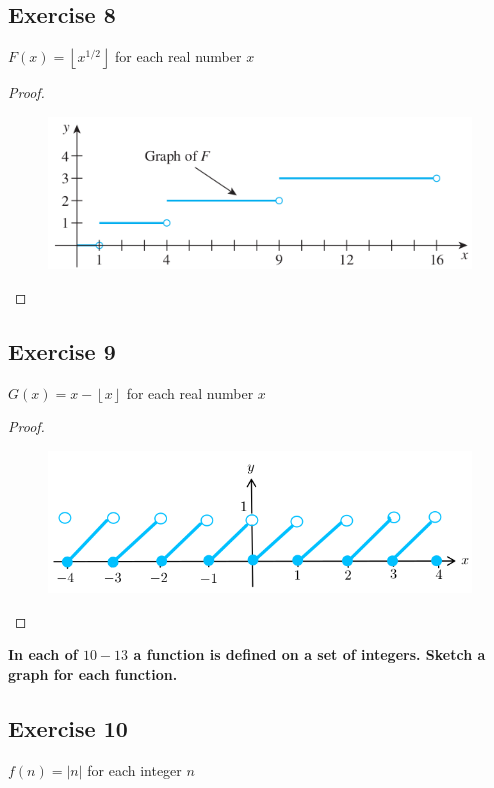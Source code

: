 \documentclass[14pt]{extarticle}
\newcommand{\cy}{\color{cyan}}
\newcommand{\floor}[1]{{\left\lfloor#1\right\rfloor}}
\begin{document}
\subsection{Exercise 8}
\(F(x) = \floor{x^{1/2}}\) for each real number \(x\)

\begin{proof}
\begin{figure}[ht!]
\centering
\includegraphics[scale=0.5]{../images/11.1.8.png}
\end{figure}
\end{proof}

\subsection{Exercise 9}
\(G(x) = x - \floor{x}\) for each real number \(x\)

\begin{proof}
\begin{figure}[ht!]
\centering
\includegraphics[scale=0.5]{../images/11.1.9.png}
\end{figure}
\end{proof}

{\bf \cy In each of \(10-13\) a function is defined on a set of integers. Sketch a graph for each function.}

\subsection{Exercise 10}
\(f(n) = |n|\) for each integer \(n\)
\end{document}

